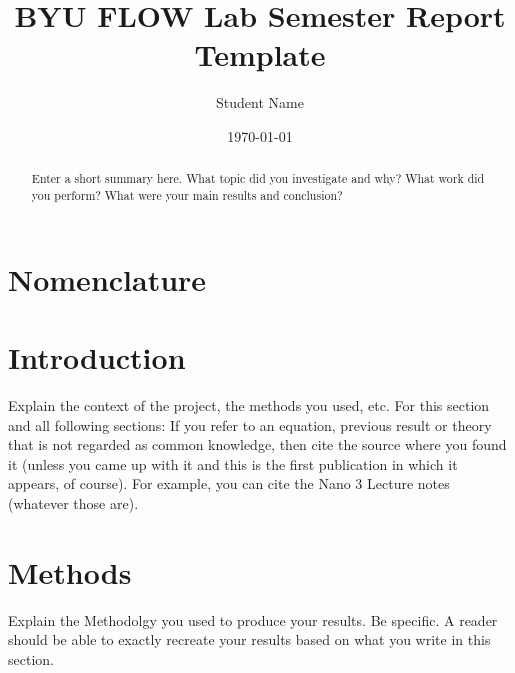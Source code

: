 \documentclass[]{article}%
\title{BYU FLOW Lab Semester Report Template}
\author{Student Name}
\date{\today} %
\begin{document}
\maketitle 

\begin{abstract}
Enter a short summary here. What topic did you investigate and why? What work did you perform? What were your main results and conclusion?
\end{abstract}

\section*{Nomenclature}
\smallskip
\begin{multicols}{2}
\printnomenclature
\end{multicols}


\section{Introduction}
\label{sec:introduction}

Explain the context of the project, the methods you used, etc.  For this section and all following sections: If you refer to an equation, previous result or theory that is not regarded as common knowledge, then cite the source where you found it (unless you came up with it and this is the first publication in which it appears, of course). For example, you can cite the Nano 3 Lecture notes \cite{nano3} (whatever those are).


\section{Methods}
\label{sec:methods}

Explain the Methodolgy you used to produce your results.  Be specific. A reader should be able to exactly recreate your results based on what you write in this section.
\end{document}
